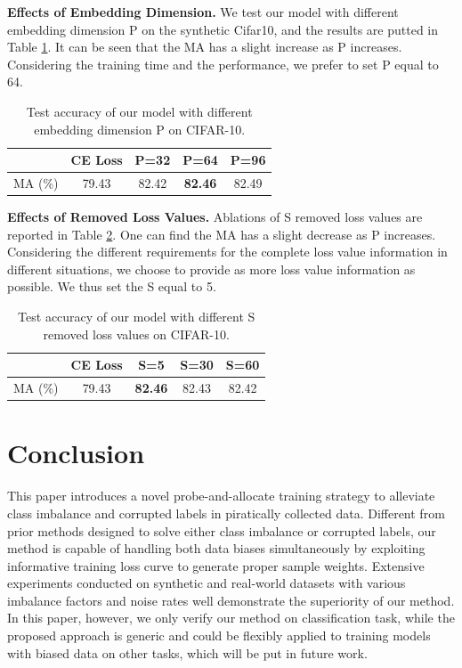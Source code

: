 \documentclass[letterpaper]{article} %
\newcommand{\bd}[1]{\textbf{#1}}
\begin{document}
\noindent\bd{Effects of Embedding Dimension.} We test our model with different embedding dimension P on the synthetic Cifar10, and the results are putted in Table \ref{tab:cifar10_P}.
It can be seen that the MA has a slight increase as P increases.
Considering the training time and the performance, we prefer to set P equal to 64.
\begin{table}[h]
\begin{center}
\tabcolsep=0.37cm
\begin{tabular}{c|c|c|c|c}
\hline
 & CE Loss &  P=32  &  P=64 &  P=96 \\
 \hline
 MA (\%)  & 79.43 & 82.42 & \textbf{82.46 } & 82.49\\
\hline
\end{tabular}%
\caption{Test accuracy of our model with different embedding dimension P on CIFAR-10.} %
\label{tab:cifar10_P}
\end{center}
\end{table}



\noindent\bd{Effects of Removed Loss Values.} Ablations of S removed loss values are reported in Table \ref{tab:cifar10_s}.
One can find the MA has a slight decrease as P increases.
Considering the different requirements for the complete loss value information in different situations, we choose to provide as more loss value information as possible.
We thus set the S equal to 5.
\begin{table}[h]
\begin{center}
\tabcolsep=0.37cm
\begin{tabular}{c|c|c|c|c}
\hline
 & CE Loss &  S=5  &  S=30 &  S=60 \\
 \hline
 MA (\%)  & 79.43 & \textbf{82.46 } & 82.43 & 82.42\\
\hline
\end{tabular}%
\caption{Test accuracy of our model with different S removed loss values on CIFAR-10.} %
\label{tab:cifar10_s}
\end{center}
\end{table}


\section{Conclusion}\label{sec:conclusion}

This paper introduces a novel probe-and-allocate training strategy to alleviate class imbalance and corrupted labels in piratically collected data.
Different from prior methods designed to solve either class imbalance or corrupted labels, our method is capable of handling both data biases simultaneously by exploiting informative training loss curve to generate proper sample weights.
Extensive experiments conducted on synthetic and real-world datasets with various imbalance factors and noise rates well demonstrate the superiority of our method.
In this paper, however, we only verify our method on classification task, while the proposed approach is generic and could be flexibly applied to training models with biased data on other tasks, which  will be put in future work.
\end{document}
